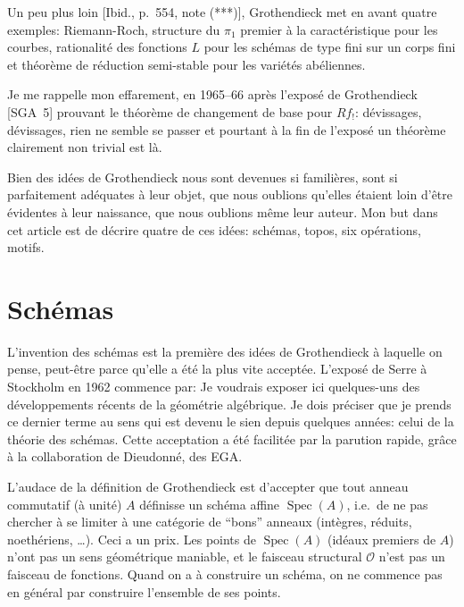 \documentclass[11pt,a4paper]{article}
\theoremstyle{plain}
\theoremstyle{definition}
\DeclareMathOperator{\Spec}{Spec}
\begin{document}
Un peu plus loin [Ibid., p.~554, note (***)], Grothendieck met en avant quatre exemples: Riemann-Roch, structure du $\pi_1$ premier \`a la caract\'eristique pour les courbes, rationalit\'e des fonctions $L$ pour les sch\'emas de type fini sur un corps fini et th\'eor\`eme de r\'eduction semi-stable pour les vari\'et\'es ab\'eliennes.

Je me rappelle mon effarement, en 1965--66 apr\`es l'expos\'e de Grothendieck [SGA~5] prouvant le th\'eor\`eme de changement de base pour $Rf_!$: d\'evissages, d\'evissages, rien ne semble se passer et pourtant \`a la fin de l'expos\'e un th\'eor\`eme clairement non trivial est l\`a.

Bien des id\'ees de Grothendieck nous sont devenues si famili\`eres, sont si parfaitement ad\'equates \`a leur objet, que nous oublions qu'elles \'etaient loin d'\^etre \'evidentes \`a leur naissance, que nous oublions m\^eme leur auteur. Mon but dans cet article est de d\'ecrire quatre de ces id\'ees: sch\'emas, topos, six op\'erations, motifs.

\section{Sch\'emas}

L'invention des sch\'emas est la premi\`ere des id\'ees de Grothendieck \`a laquelle on pense, peut-\^etre parce qu'elle a \'et\'e la plus vite accept\'ee. L'expos\'e de Serre \`a Stockholm en 1962 commence par: \guillemotleft Je voudrais exposer ici quelques-uns des d\'eveloppements r\'ecents de la g\'eom\'etrie alg\'ebrique. Je dois pr\'eciser que je prends ce dernier terme au sens qui est devenu le sien depuis quelques ann\'ees: celui de la th\'eorie des sch\'emas.\guillemotright{} Cette acceptation a \'et\'e facilit\'ee par la parution rapide, gr\^ace \`a la collaboration de Dieudonn\'e, des EGA.

L'audace de la d\'efinition de Grothendieck est d'accepter que tout anneau commutatif (\`a unit\'e) $A$ d\'efinisse un sch\'ema affine $\Spec(A)$, i.e.\ de ne pas chercher \`a se limiter \`a une cat\'egorie de ``bons'' anneaux (int\`egres, r\'eduits, noeth\'eriens, \ldots). Ceci a un prix. Les points de $\Spec(A)$ (id\'eaux premiers de $A$) n'ont pas un sens g\'eom\'etrique maniable, et le faisceau structural $\mathcal{O}$ n'est pas un faisceau de fonctions. Quand on a \`a construire un sch\'ema, on ne commence pas en g\'en\'eral par construire l'ensemble de ses points.
\end{document}
